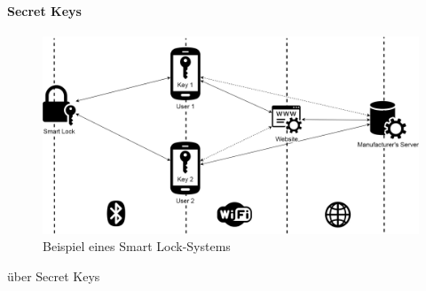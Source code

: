 		\paragraph{Secret Keys}
		\begin{figure}[H]
			\centering
			\includegraphics[width=\textwidth]{graphics/sl_arch.png}
			\caption{Beispiel eines Smart Lock-Systems}
			\label{fig:sl_arch}
		\end{figure}
		über Secret Keys\cite{Fuller2017}
